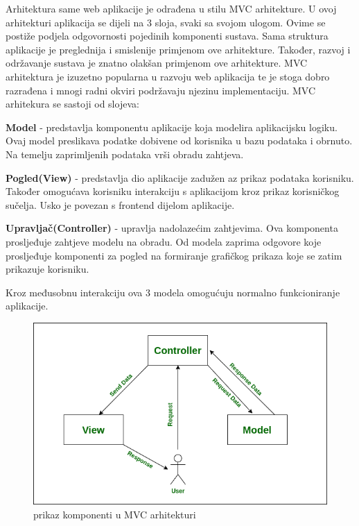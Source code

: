 		Arhitektura same web aplikacije je odrađena u stilu MVC arhitekture. U ovoj arhitekturi aplikacija se dijeli na 3 sloja, svaki sa svojom ulogom. Ovime se postiže podjela odgovornosti pojedinih komponenti sustava. Sama struktura aplikacije je preglednija i smislenije primjenom ove arhitekture. Također, razvoj i održavanje sustava je znatno olakšan primjenom ove arhitekture. MVC arhitektura je izuzetno popularna u razvoju web aplikacija te je stoga dobro razrađena i mnogi radni okviri podržavaju njezinu implementaciju. MVC arhitekura se sastoji od slojeva:
		\begin{packed_item}
			\item \textbf{Model} - predstavlja komponentu aplikacije koja modelira aplikacijsku logiku. Ovaj model preslikava podatke dobivene od korisnika u bazu podataka i obrnuto. Na temelju zaprimljenih podataka vrši obradu zahtjeva.
			
			\item \textbf{Pogled(View)} - predstavlja dio aplikacije zadužen az prikaz podataka korisniku. Također omogućava korisniku interakciju s aplikacijom kroz prikaz korisničkog sučelja. Usko je povezan s frontend dijelom aplikacije.
			
			\item \textbf{Upravljač(Controller)} - upravlja nadolazećim zahtjevima. Ova komponenta prosljeđuje zahtjeve modelu na obradu. Od modela zaprima odgovore koje prosljeđuje komponenti za pogled na formiranje grafičkog prikaza koje se zatim prikazuje korisniku.
		\end{packed_item}
		
		Kroz međusobnu interakciju ova 3 modela omogućuju normalno funkcioniranje aplikacije.
		
		\begin{figure}[H]
			\includegraphics[width=\textwidth]{slike/mvc.png} %
			\caption{prikaz komponenti u MVC arhitekturi}
			\label{fig:MVC1} %
		\end{figure}
		
